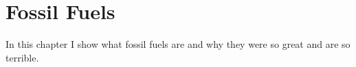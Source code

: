 \setchapterpreamble[u]{\margintoc}
\chapter{Fossil Fuels}

In this chapter I show what fossil fuels are and why they were so great and are so terrible.